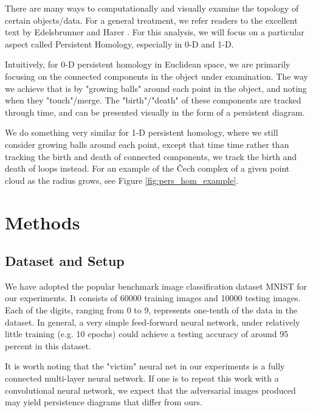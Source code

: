 \documentclass[twoside,twocolumn]{article}
\begin{document}
There are many ways to computationally and visually examine the topology of certain objects/data. For a general treatment, we refer readers to the excellent text by Edelsbrunner and Harer \cite{edelsbrunnerharer}. For this analysis, we will focus on a particular aspect called Persistent Homology, especially in 0-D and 1-D. 

Intuitively, for 0-D persistent homology in Euclidean space, we are primarily focusing on the connected components in the object under examination. The way we achieve that is by "growing balls" around each point in the object, and noting when they "touch"/merge. The "birth"/"death" of these components are tracked through time, and can be presented visually in the form of a persistent diagram. 

We do something very similar for 1-D persistent homology, where we still consider growing balls around each point, except that time time rather than tracking the birth and death of connected components, we track the birth and death of loops instead. For an example of the \v Cech complex of a given point cloud as the radius grows, see Figure \ref{fig:pers_hom_example}. 


\section{Methods}

\subsection{Dataset and Setup}
We have adopted the popular benchmark image classification dataset MNIST for our experiments. It consists of 60000 training images and 10000 testing images. Each of the digits, ranging from 0 to 9, represents one-tenth of the data in the dataset. In general, a very simple feed-forward neural network, under relatively little training (e.g. 10 epochs) could achieve a testing accuracy of around 95 percent in this dataset. 

It is worth noting that the "victim" neural net in our experiments is a fully connected multi-layer neural network. If one is to repeat this work with a convolutional neural network, we expect that the adversarial images produced may yield persistence diagrams that differ from ours.
\end{document}
